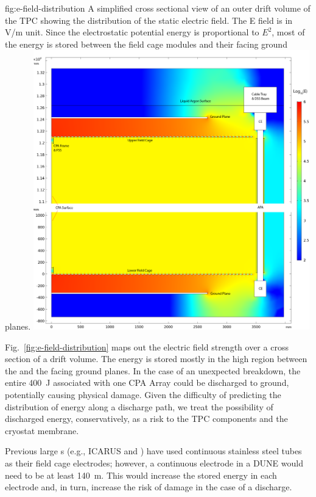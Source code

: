 \begin{dunefigure}
{fig:e-field-distribution}
{A simplified cross sectional view of an outer drift volume of the TPC showing the distribution of the static electric field.  The E field is in V/m unit.  Since the electrostatic potential energy is proportional to $E^2$, most of the energy is stored between the field cage modules and their facing ground planes.   }
\centering
\includegraphics[width=0.9\textwidth]{graphics/E_Field_Distribution.png} 
\end{dunefigure}

Fig.~\ref{fig:e-field-distribution} maps out the electric field strength over a cross section of a drift volume.  
The energy is stored mostly in the high \efield{} region between the  and the facing ground planes.  In the case of an unexpected  breakdown, the entire \SI{400}{J} associated with one CPA Array could be discharged to ground,
potentially causing physical damage.
Given the difficulty of predicting the distribution of energy along a discharge path, we treat the possibility of discharged energy, conservatively, as a risk to the TPC components and the cryostat membrane. 

Previous large \lartpc{}s (e.g., ICARUS and \microboone) have used continuous stainless steel tubes as their field cage electrodes;
however, a continuous electrode in a DUNE  would need to be at least \SI{140}{\m}. This would increase the stored energy in each electrode and, in turn, increase the risk of damage in the case of a discharge. 


